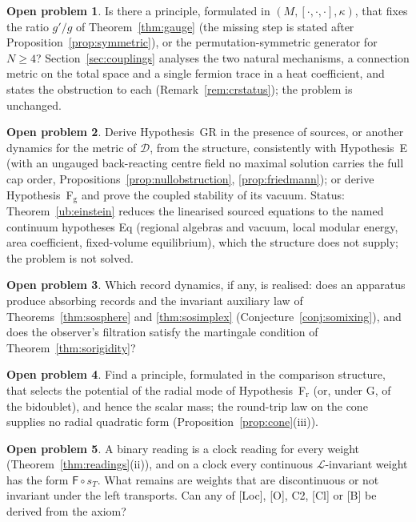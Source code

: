\documentclass[aps,pra,onecolumn,superscriptaddress,nofootinbib,10pt]{revtex4-2}
\theoremstyle{definition}
\newtheorem{problem}{Open problem}
\theoremstyle{remark}
\newcommand{\cL}{\mathcal{L}}
\newcommand{\cD}{\mathcal{D}}
\newcommand{\hp}[3]{[#1,#2,#3]}
\begin{document}
\begin{problem}
Is there a principle, formulated in $(M,\hp{\cdot}{\cdot}{\cdot},\kappa)$, that fixes the ratio $g'/g$ of
Theorem~\ref{thm:gauge} (the missing step is stated after Proposition~\ref{prop:symmetric}), or the
permutation-symmetric generator for $N\ge4$?  Section~\ref{sec:couplings} analyses the two natural
mechanisms, a connection metric on the total space and a single fermion trace in a heat coefficient, and
states the obstruction to each (Remark~\ref{rem:crstatus}); the problem is unchanged.
\end{problem}
\begin{problem}
Derive Hypothesis~GR in the presence of sources, or another dynamics for the metric of $\cD$, from the
structure, consistently with Hypothesis~E (with an ungauged back-reacting centre field no maximal solution
carries the full cap order, Propositions~\ref{prop:nullobstruction}, \ref{prop:friedmann}); or derive Hypothesis~F$_{\mathrm g}$ and prove the coupled stability of its vacuum.
Status: Theorem~\ref{ub:einstein} reduces the linearised sourced equations to the named continuum hypotheses Eq
(regional algebras and vacuum, local modular energy, area coefficient, fixed-volume equilibrium), which
the structure does not supply; the problem is not solved.
\end{problem}
\begin{problem}
Which record dynamics, if any, is realised: does an apparatus produce absorbing records and the
invariant auxiliary law of Theorems~\ref{thm:sosphere} and \ref{thm:sosimplex} (Conjecture~\ref{conj:somixing}), and does the
observer's filtration satisfy the martingale condition of Theorem~\ref{thm:sorigidity}?
\end{problem}
\begin{problem}
Find a principle, formulated in the comparison structure, that selects the potential of the radial
mode of Hypothesis~F$_{\mathrm r}$ (or, under G, of the bidoublet), and hence the scalar mass; the round-trip law on
the cone supplies no radial quadratic form (Proposition~\ref{prop:cone}(iii)).
\end{problem}
\begin{problem}
A binary reading is a clock reading for every weight (Theorem~\ref{thm:readings}(ii)), and on a clock every
continuous $\cL$-invariant weight has the form $\mathsf F\circ s_T$.  What remains are weights that are discontinuous
or not invariant under the left transports.  Can any of [Loc], [O], C2, [Cl] or [B] be derived from the axiom?
\end{problem}
\end{document}
